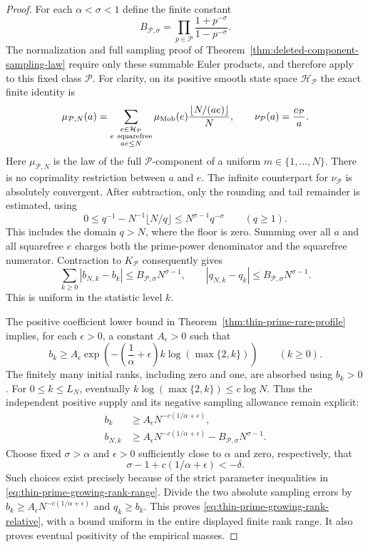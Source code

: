 \documentclass[11pt]{article}
\theoremstyle{definition}
\begin{document}
\begin{proof}
For each $\alpha<\sigma<1$ define the finite constant
\[
 B_{\mathcal P,\sigma}
       =\prod_{p\in\mathcal P}
                    \frac{1+p^{-\sigma}}{1-p^{-\sigma}}.
\]
The normalization and full sampling proof of
Theorem~\ref{thm:deleted-component-sampling-law} require only
these summable Euler products, and therefore apply to this
fixed class $\mathcal P$.
For clarity, on its positive smooth state space
$\mathcal H_{\mathcal P}$ the exact finite identity is
\[
 \mu_{\mathcal P,N}(a)=
 \sum_{\substack{e\in\mathcal H_{\mathcal P}\\
                   e\ {\rm squarefree}\\ae\le N}}
      \mu_{\rm Mob}(e)\frac{\lfloor N/(ae)\rfloor}{N},
 \qquad
 \nu_{\mathcal P}(a)=\frac{c_{\mathcal P}}a .
\]
Here $\mu_{\mathcal P,N}$ is the law of the full
$\mathcal P$-component of a uniform $m\in\{1,\ldots,N\}$.
There is no coprimality restriction between $a$ and $e$.
The infinite counterpart for $\nu_{\mathcal P}$ is absolutely
convergent.  After subtraction, only the rounding and tail
remainder is estimated, using
\[
 0\le q^{-1}-N^{-1}\lfloor N/q\rfloor
          \le N^{\sigma-1}q^{-\sigma}\qquad(q\ge1).
\]
This includes the domain $q>N$, where the floor is zero.
Summing over all $a$ and all squarefree $e$ charges both the
prime-power denominator and the squarefree numerator.
Contraction to $K_{\mathcal P}$ consequently gives
\begin{equation}
 \sum_{k\ge0}|b_{N,k}-b_k|
       \le B_{\mathcal P,\sigma}N^{\sigma-1},\qquad
 |q_{N,k}-q_k|\le B_{\mathcal P,\sigma}N^{\sigma-1}.
 \label{eq:thin-prime-profile-sampling-budget}
\end{equation}
This is uniform in the statistic level $k$.

The positive coefficient lower bound in
Theorem~\ref{thm:thin-prime-rare-profile} implies, for each
$\epsilon>0$, a constant $A_\epsilon>0$ such that
\[
 b_k\ge A_\epsilon
          \exp\!\left(-\left(\frac1\alpha+\epsilon\right)
                        k\log(\max\{2,k\})\right)
                                      \qquad(k\ge0).
\]
The finitely many initial ranks, including zero and one,
are absorbed using $b_k>0$.
For $0\le k\le L_N$, eventually
$k\log(\max\{2,k\})\le c\log N$.
Thus the independent positive supply and its negative
sampling allowance remain explicit:
\[
 \begin{aligned}
 b_k&\ge A_\epsilon N^{-c(1/\alpha+\epsilon)},\\
 b_{N,k}&\ge
 A_\epsilon N^{-c(1/\alpha+\epsilon)}
          -B_{\mathcal P,\sigma}N^{\sigma-1}.
 \end{aligned}
\]
Choose fixed $\sigma>\alpha$ and $\epsilon>0$ sufficiently
close to $\alpha$ and zero, respectively, that
\[
 \sigma-1+c(1/\alpha+\epsilon)<-\delta .
\]
Such choices exist precisely because of the strict
parameter inequalities in
\eqref{eq:thin-prime-growing-rank-range}.
Divide the two absolute sampling errors by
$b_k\ge A_\epsilon N^{-c(1/\alpha+\epsilon)}$ and
$q_k\ge b_k$.  This proves
\eqref{eq:thin-prime-growing-rank-relative}, with a bound
uniform in the entire displayed finite rank range.
It also proves eventual positivity of the empirical masses.


\end{proof}
\end{document}
